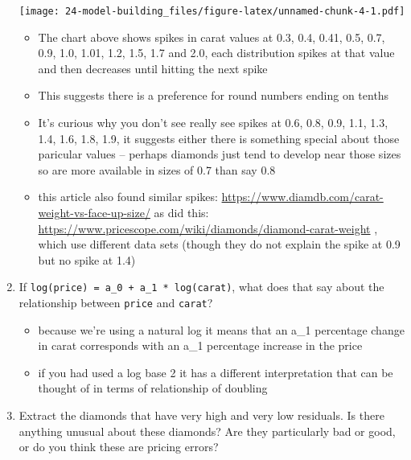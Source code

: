\documentclass[]{book}
\newenvironment{Shaded}{\begin{snugshade}}{\end{snugshade}}
\newcommand{\DataTypeTok}[1]{\textcolor[rgb]{0.13,0.29,0.53}{#1}}
\newcommand{\DecValTok}[1]{\textcolor[rgb]{0.00,0.00,0.81}{#1}}
\newcommand{\FloatTok}[1]{\textcolor[rgb]{0.00,0.00,0.81}{#1}}
\newcommand{\KeywordTok}[1]{\textcolor[rgb]{0.13,0.29,0.53}{\textbf{#1}}}
\newcommand{\NormalTok}[1]{#1}
\newcommand{\OperatorTok}[1]{\textcolor[rgb]{0.81,0.36,0.00}{\textbf{#1}}}
\newcommand{\StringTok}[1]{\textcolor[rgb]{0.31,0.60,0.02}{#1}}
\providecommand{\tightlist}{%
  \setlength{\itemsep}{0pt}\setlength{\parskip}{0pt}}
\theoremstyle{definition}
\theoremstyle{definition}
\theoremstyle{definition}
\theoremstyle{remark}
\begin{document}
\begin{enumerate}
\begin{Shaded}
\end{Shaded}

  \texttt{[image: 24-model-building\_files/figure-latex/unnamed-chunk-4-1.pdf]}

  \begin{itemize}
  \tightlist
  \item
    The chart above shows spikes in carat values at 0.3, 0.4, 0.41, 0.5,
    0.7, 0.9, 1.0, 1.01, 1.2, 1.5, 1.7 and 2.0, each distribution spikes
    at that value and then decreases until hitting the next spike
  \item
    This suggests there is a preference for round numbers ending on
    tenths
  \item
    It's curious why you don't see really see spikes at 0.6, 0.8, 0.9,
    1.1, 1.3, 1.4, 1.6, 1.8, 1.9, it suggests either there is something
    special about those paricular values -- perhaps diamonds just tend
    to develop near those sizes so are more available in sizes of 0.7
    than say 0.8
  \item
    this article also found similar spikes:
    \url{https://www.diamdb.com/carat-weight-vs-face-up-size/} as did
    this:
    \url{https://www.pricescope.com/wiki/diamonds/diamond-carat-weight}
    , which use different data sets (though they do not explain the
    spike at 0.9 but no spike at 1.4)
  \end{itemize}
\item
  If \texttt{log(price)\ =\ a\_0\ +\ a\_1\ *\ log(carat)}, what does
  that say about the relationship between \texttt{price} and
  \texttt{carat}?

  \begin{itemize}
  \tightlist
  \item
    because we're using a natural log it means that an a\_1 percentage
    change in carat corresponds with an a\_1 percentage increase in the
    price
  \item
    if you had used a log base 2 it has a different interpretation that
    can be thought of in terms of relationship of doubling
  \end{itemize}
\item
  Extract the diamonds that have very high and very low residuals. Is
  there anything unusual about these diamonds? Are they particularly bad
  or good, or do you think these are pricing errors?


\end{enumerate}
\end{document}
